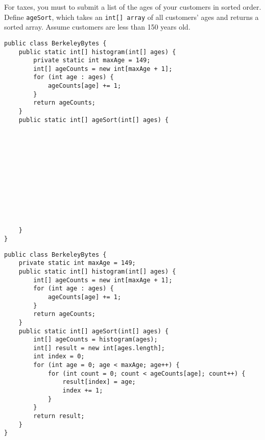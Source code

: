 \begin{blocksection}
\question For taxes, you must to submit a list of the ages of your customers in
sorted order. Define \lstinline$ageSort$, which takes an
\lstinline$int[] array$ of all customers' ages and returns a sorted array.
Assume customers are less than 150 years old.

\ifprintanswers
\else
\begin{lstlisting}
public class BerkeleyBytes {
    public static int[] histogram(int[] ages) {
        private static int maxAge = 149;
        int[] ageCounts = new int[maxAge + 1];
        for (int age : ages) {
            ageCounts[age] += 1;
        }
        return ageCounts;
    }
    public static int[] ageSort(int[] ages) {












    }
}
\end{lstlisting}
\fi

\begin{solution}
\begin{lstlisting}
public class BerkeleyBytes {
    private static int maxAge = 149;
    public static int[] histogram(int[] ages) {
        int[] ageCounts = new int[maxAge + 1];
        for (int age : ages) {
            ageCounts[age] += 1;
        }
        return ageCounts;
    }
    public static int[] ageSort(int[] ages) {
        int[] ageCounts = histogram(ages);
        int[] result = new int[ages.length];
        int index = 0;
        for (int age = 0; age < maxAge; age++) {
            for (int count = 0; count < ageCounts[age]; count++) {
                result[index] = age;
                index += 1;
            }
        }
        return result;
    }
}
\end{lstlisting}
\end{solution}
\end{blocksection}
